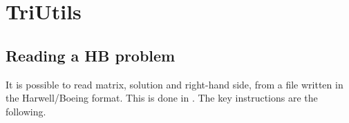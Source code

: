 % 
% 
% 
%   
%   
% 
% 

\chapter{TriUtils}
\label{chap:triutils}

\section{Reading a HB problem}

It is possible to read matrix, solution and right-hand side, from a file
written in the Harwell/Boeing format. This is done in
. The key instructions are the following.


